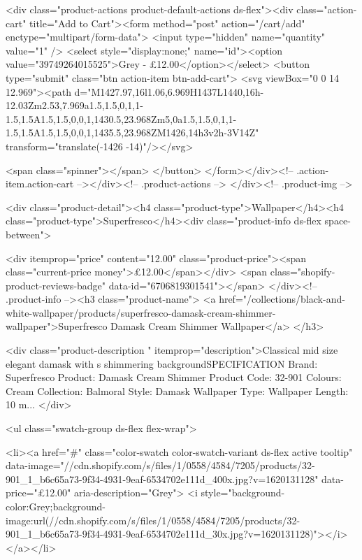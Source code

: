 {{{{{{{<div class="product-actions product-default-actions ds-flex"><div class="action-cart" title="Add to Cart"><form method="post" action="/cart/add" enctype="multipart/form-data">
            <input type="hidden" name="quantity" value="1" />
            <select style="display:none;" name="id"><option value="39749264015525">Grey - £12.00</option></select>
            <button type="submit" class="btn action-item btn-add-cart">
              <svg viewBox="0 0 14 12.969"><path d="M1427.97,16l1.06,6.969H1437L1440,16h-12.03Zm2.53,7.969a1.5,1.5,0,1,1-1.5,1.5A1.5,1.5,0,0,1,1430.5,23.968Zm5,0a1.5,1.5,0,1,1-1.5,1.5A1.5,1.5,0,0,1,1435.5,23.968ZM1426,14h3v2h-3V14Z" transform="translate(-1426 -14)"/></svg>

              <span class="spinner"></span>
            </button>
          </form></div><!-- .action-item.action-cart --></div><!-- .product-actions -->
</div><!-- .product-img -->

<div class="product-detail"><h4 class="product-type">Wallpaper</h4><h4 class="product-type">Superfresco</h4><div class="product-info ds-flex space-between">
    
<div itemprop="price" content="12.00" class="product-price"><span class="current-price money">£12.00</span></div>
    <span class="shopify-product-reviews-badge" data-id="6706819301541"></span>
  </div><!-- .product-info --><h3 class="product-name">
      <a href="/collections/black-and-white-wallpaper/products/superfresco-damask-cream-shimmer-wallpaper">Superfresco Damask Cream Shimmer Wallpaper</a>
    </h3>
    
<div class="product-description " itemprop="description">Classical mid size elegant damask with s shimmering backgroundSPECIFICATION Brand: Superfresco Product: Damask Cream Shimmer Product Code: 32-901 Colours: Cream Collection: Balmoral Style: Damask Wallpaper Type: Wallpaper Length: 10 m...
</div>



<ul class="swatch-group ds-flex flex-wrap">
        
<li><a href="#" class="color-swatch color-swatch-variant ds-flex active tooltip" data-image="//cdn.shopify.com/s/files/1/0558/4584/7205/products/32-901_1_b6c65a73-9f34-4931-9eaf-6534702e111d_400x.jpg?v=1620131128" data-price="£12.00" aria-description="Grey">
              <i style="background-color:Grey;background-image:url(//cdn.shopify.com/s/files/1/0558/4584/7205/products/32-901_1_b6c65a73-9f34-4931-9eaf-6534702e111d_30x.jpg?v=1620131128)"></i>
            </a></li>

}}}}}}}
